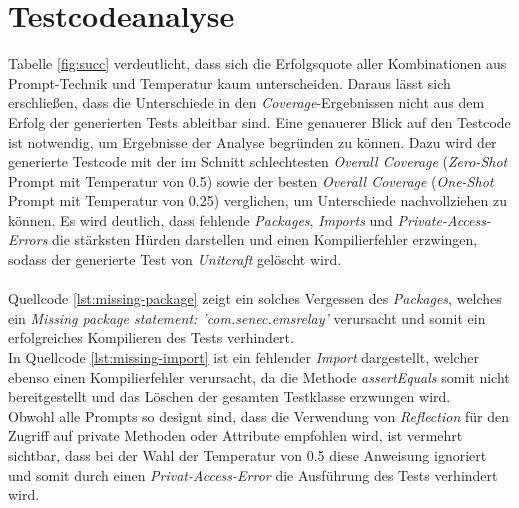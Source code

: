 \section{Testcodeanalyse}
Tabelle \ref{fig:succ} verdeutlicht, dass sich die Erfolgsquote aller Kombinationen aus Prompt-Technik und Temperatur kaum unterscheiden. Daraus lässt sich erschließen, dass die Unterschiede in den \textit{Coverage}-Ergebnissen nicht aus dem Erfolg der generierten Tests ableitbar sind. Eine genauerer Blick auf den Testcode ist notwendig, um Ergebnisse der Analyse begründen zu können. Dazu wird der generierte Testcode mit der im Schnitt schlechtesten \textit{Overall Coverage}  (\textit{Zero-Shot} Prompt mit Temperatur von 0.5) sowie der besten \textit{Overall Coverage}  (\textit{One-Shot} Prompt mit Temperatur von 0.25) verglichen, um Unterschiede nachvollziehen zu können. Es wird deutlich, dass fehlende \textit{Packages}, \textit{Imports} und \textit{Private-Access-Errors} die stärksten Hürden darstellen und einen Kompilierfehler erzwingen, sodass der generierte Test von \textit{Unitcraft} gelöscht wird. \\\\
Quellcode \ref{lst:missing-package} zeigt ein solches Vergessen des \textit{Packages}, welches ein \textit{Missing package statement: 'com.senec.emsrelay'} verursacht und somit ein erfolgreiches Kompilieren des Tests verhindert.\\

In Quellcode \ref{lst:missing-import} ist ein fehlender \textit{Import} dargestellt, welcher ebenso einen Kompilierfehler verursacht, da die Methode \textit{assertEquals} somit nicht bereitgestellt und das Löschen der gesamten Testklasse erzwungen wird.\\

Obwohl alle Prompts so designt sind, dass die Verwendung von \textit{Reflection} für den Zugriff auf private Methoden oder Attribute empfohlen wird, ist vermehrt sichtbar, dass bei der Wahl der Temperatur von 0.5 diese Anweisung ignoriert und somit durch einen \textit{Privat-Access-Error} die Ausführung des Tests verhindert wird.\\
